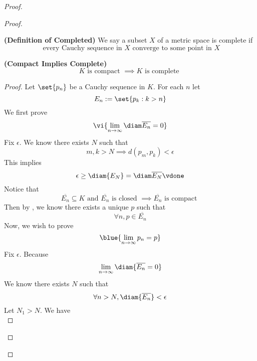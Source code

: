 \documentclass{report}
\begin{document}
\begin{proof}
\begin{proof}
\begin{definition}
\label{3.10.7}
\textbf{(Definition of Completed)} We say a subset $X$ of a metric space is complete if 
\begin{equation}
\text{ every Cauchy sequence in $X$ converge to some point in $X$}
\end{equation}
\end{definition}
\begin{theorem}
\label{3.10.8}
\textbf{(Compact Implies Complete)} 
\begin{equation}
K\text{ is compact }\implies K\text{ is complete }
\end{equation}
\end{theorem}
\begin{proof}
Let $\set{p_n}$ be a Cauchy sequence in $K$. For each $n$ let
 \begin{equation}
E_n:=\set{p_k:k> n}
\end{equation}
We first prove 
\begin{equation}
  \vi{\lim_{n\to\infty}\diam \overline{E_n}=0}
\end{equation}
Fix $\epsilon $. We know there exists $N$ such that
 \begin{equation}
m,k>N\implies d(p_m,p_k)<\epsilon 
\end{equation}
This implies
\begin{equation}
\epsilon \geq \diam{E_N}=\diam \overline{E_N}\vdone
\end{equation}
Notice that
\begin{equation}
\overline{E_n}\subseteq K\text{ and }\overline{E_n}\text{ is closed }\implies \overline{E_n}\text{ is compact }
\end{equation}
Then by , we know there exists a unique $p$ such that
 \begin{equation}
\forall n, p\in  \overline{E_n}
\end{equation}
Now, we wish to prove
\begin{equation}
  \blue{\lim_{n\to\infty}p_n=p}
\end{equation}
Fix $\epsilon $. Because
\begin{equation} \lim_{n\to\infty}\diam{\overline{E_n}=0}
\end{equation}
We know there exists $N$ such that
 \begin{equation}
\forall n>N, \diam{\overline{E_n}}<\epsilon 
\end{equation}
Let $N_1>N$. We have
 \begin{equation}

\end{equation}
\end{proof}
\end{proof}
\end{proof}
\end{document}
